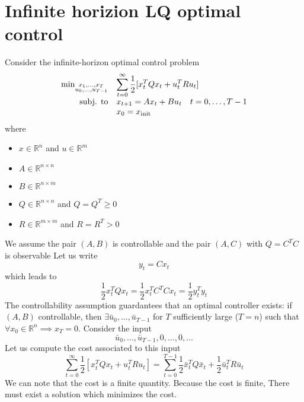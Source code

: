 \documentclass{book}
\newcommand{\R}{\mathbb{R}}
\theoremstyle{definition}
\theoremstyle{remark}
\theoremstyle{remark}
\begin{document}
\section{Infinite horizion LQ optimal control}
Consider the infinite-horizon optimal control problem
\[
    \begin{array}{r l}
        \min_{\substack{x_1,\dots,x_T \\ u_0,\dots,u_{T-1}}} & \displaystyle\sum_{t=0}^{\infty}\displaystyle\frac{1}{2}[x_t^TQx_t+u_t^TRu_t] \\
        \text{subj. to} & x_{t+1} = Ax_t + Bu_t \quad t=0,\dots,T-1\\
                        &x_0 = x_{\text{init}}
    \end{array}
\]
where 
\begin{itemize}
    \item $x\in\R^n$ and $u\in\R^m$
    \item $A\in\R^{n\times n}$
    \item $B\in\R^{n\times m}$
    \item $Q\in\R^{n\times n}$ and $Q=Q^T\geq 0$
    \item $R\in\R^{m\times m}$ and $R=R^T> 0$
\end{itemize}
We assume the pair $(A,B)$ is controllable and the pair $(A,C)$ with $Q=C^TC$ is observable
Let us write 
\[
    y_t=Cx_t
\]
which leads to 
\[
    \displaystyle\frac{1}{2}x_t^TQx_t = \displaystyle\frac{1}{2}x_t^TC^TCx_t = \displaystyle\frac{1}{2}y_t^Ty_t
\]
The controllability assumption guardantees that an optimal controller exists: if $(A,B)$ controllable, then $\exists \bar{u}_0,\dots,\bar{u}_{T-1}$ for $T$ sufficiently large ($T=n$) such that $\forall x_0\in \R^n\implies x_T=0$. Consider the input
\[
    \bar{u}_0,\dots,\bar{u}_{T-1},0,\dots,0,\dots
\]
Let us compute the cost associated to this input 
\[
    \displaystyle\sum_{t=0}^{\infty}\displaystyle\frac{1}{2}[x_t^TQx_t+u_t^TRu_t] =\displaystyle\sum_{t=0}^{T-1}\displaystyle\frac{1}{2}\bar{x}_t^TQ\bar{x}_t + \displaystyle\frac{1}{2}\bar{u}_t^TR\bar{u}_t
\]
We can note that the cost is a finite quantity. Because the cost is finite, There must exist a solution which minimizes the cost.
\proposition
\end{document}
